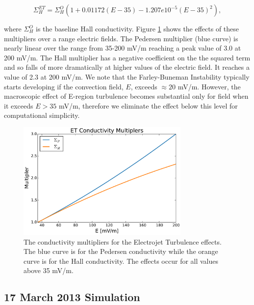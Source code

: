 \documentclass[draft,jgrga]{agutex}
\begin{document}
\begin{article}
\begin{equation}
\label{eq-sigmah-fbi}
\Sigma_H^{ET} = \Sigma_H^O(1+0.01172 (E - 35) - 1.207e10^{-5}(E - 35)^2),
\end{equation}

where $\Sigma_H^O$ is the baseline Hall conductivity.   Figure \ref{fbi-multi-fig} shows the effects of these multipliers over a range electric fields.  The Pedersen multiplier (blue curve) is nearly linear over the range from 35-200 mV/m reaching a peak value of 3.0 at 200 mV/m.  The Hall multiplier has a negative coefficient on the the squared term and so falls of more dramatically at higher values of the electric field.  It reaches a value of 2.3 at 200 mV/m.  We note that the Farley-Buneman Instability typically starts developing if the convection field, $E$, exceeds $\approx20$ mV/m. However, the macroscopic effect of E-region turbulence becomes substantial only for field when it exceeds $E>35$ mV/m, therefore we eliminate the effect below this level for computational simplicity. 

\begin{figure}
\noindent\includegraphics[width=20pc]{JGRPaper-ConductMulti.pdf}
\caption{\label{fbi-multi-fig} 
The conductivity multipliers for the Electrojet Turbulence effects.  The blue curve is for the Pedersen conductivity while the orange curve is for the Hall conductivity.  The effects occur for all values above 35 mV/m.  } 
\end{figure}

\subsection{17 March 2013 Simulation}
\label{sec-17mar13}


\end{article}
\end{document}
